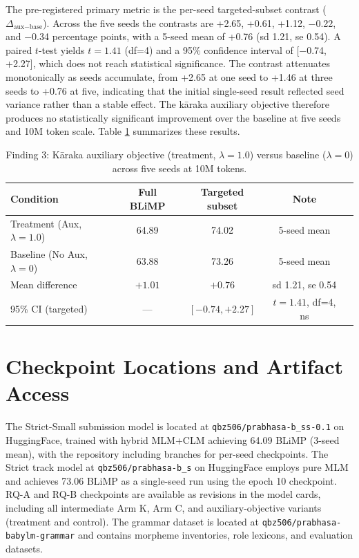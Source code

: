 The pre-registered primary metric is the per-seed targeted-subset contrast ($\Delta_{\text{aux}-\text{base}}$). Across the five seeds the contrasts are +2.65, +0.61, +1.12, −0.22, and −0.34 percentage points, with a 5-seed mean of +0.76 (sd 1.21, se 0.54). A paired $t$-test yields $t=1.41$ (df=4) and a 95\% confidence interval of [−0.74, +2.27], which does not reach statistical significance. The contrast attenuates monotonically as seeds accumulate, from +2.65 at one seed to +1.46 at three seeds to +0.76 at five, indicating that the initial single-seed result reflected seed variance rather than a stable effect. The kāraka auxiliary objective therefore produces no statistically significant improvement over the baseline at five seeds and 10M token scale. Table \ref{tab:f3-results} summarizes these results.

\begin{table}[h]
\centering
\small
\caption{Finding 3: Kāraka auxiliary objective (treatment, $\lambda=1.0$) versus baseline ($\lambda=0$) across five seeds at 10M tokens.}
\label{tab:f3-results}
\begin{tabular}{lcccc}
\toprule
Condition & Full BLiMP & Targeted subset & Note \\
\midrule
Treatment (Aux, $\lambda=1.0$) & 64.89 & 74.02 & 5-seed mean \\
Baseline (No Aux, $\lambda=0$) & 63.88 & 73.26 & 5-seed mean \\
\midrule
Mean difference & $+1.01$ & $+0.76$ & sd 1.21, se 0.54 \\
95\% CI (targeted) & — & {$[-0.74, +2.27]$} & $t=1.41$, df=4, ns \\
\bottomrule
\end{tabular}
\end{table}

\section{Checkpoint Locations and Artifact Access}

The Strict-Small submission model is located at \texttt{qbz506/prabhasa-b\_ss-0.1} on HuggingFace, trained with hybrid MLM+CLM achieving 64.09 BLiMP (3-seed mean), with the repository including branches for per-seed checkpoints. The Strict track model at \texttt{qbz506/prabhasa-b\_s} on HuggingFace employs pure MLM and achieves 73.06 BLiMP as a single-seed run using the epoch 10 checkpoint. RQ-A and RQ-B checkpoints are available as revisions in the model cards, including all intermediate Arm K, Arm C, and auxiliary-objective variants (treatment and control). The grammar dataset is located at \texttt{qbz506/prabhasa-babylm-grammar} and contains morpheme inventories, role lexicons, and evaluation datasets.

